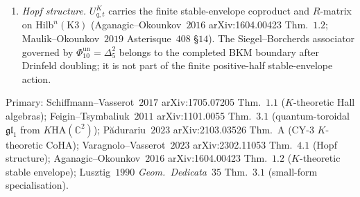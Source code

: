 \begin{conjecture}
\begin{enumerate}[label=\textup{(\roman*)}]
unity $q=e^{2\pi i/8}=\zeta_8$, the $K$-theoretic K3 quantum toroidal
branch specialises to the finite positive/Mukai block at Lusztig level
$\ell_{\mathrm{K3}}=2c_+(\mathrm{II}_{4,20})=8$. Its comparison with the
BKM small form $\mathfrak u_{\zeta_8}(\Delta_5)$ of
Chapter~\ref{ch:k3-chiral-bialgebra-platonic}
Definition~\ref{def:qgf-weight-truncated-small-form} requires the
completed Hall--Drinfeld double of Remark~\ref{rem:k3qt-bkm-shadow}.
\item \emph{Hopf structure.} $U^K_{q,t}$ carries the finite
stable-envelope coproduct and $R$-matrix on
$\mathrm{Hilb}^n(\mathrm K3)$ (Aganagic--Okounkov~$2016$
arXiv:1604.00423 Thm.~$1.2$; Maulik--Okounkov~$2019$ Asterisque~$408$
\S $14$). The Siegel--Borcherds associator governed by
$\Phi_{10}^{\mathrm{un}}=\Delta_5^2$ belongs to the completed BKM boundary after
Drinfeld doubling; it is not part of the finite positive-half
stable-envelope action.
\end{enumerate}
Primary: Schiffmann--Vasserot~$2017$ arXiv:1705.07205 Thm.~$1.1$
($K$-theoretic Hall algebras); Feigin--Tsymbaliuk~$2011$
arXiv:1101.0055 Thm.~$3.1$ (quantum-toroidal $\mathfrak{gl}_1$ from
$K\mathrm{HA}(\mathbb{C}^2)$); P\u{a}durariu~$2023$
arXiv:2103.03526 Thm.~A (CY-$3$ $K$-theoretic CoHA);
Varagnolo--Vasserot~$2023$ arXiv:2302.11053 Thm.~$4.1$ (Hopf
structure); Aganagic--Okounkov~$2016$ arXiv:1604.00423
Thm.~$1.2$ ($K$-theoretic stable envelope);
Lusztig~$1990$ \emph{Geom.\ Dedicata}~$35$ Thm.~$3.1$ (small-form
specialisation).
\end{conjecture}

